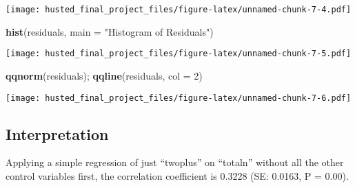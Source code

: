 \documentclass[
]{article}
\newenvironment{Shaded}{\begin{snugshade}}{\end{snugshade}}
\newcommand{\AttributeTok}[1]{\textcolor[rgb]{0.13,0.29,0.53}{#1}}
\newcommand{\CommentTok}[1]{\textcolor[rgb]{0.56,0.35,0.01}{\textit{#1}}}
\newcommand{\DecValTok}[1]{\textcolor[rgb]{0.00,0.00,0.81}{#1}}
\newcommand{\DocumentationTok}[1]{\textcolor[rgb]{0.56,0.35,0.01}{\textbf{\textit{#1}}}}
\newcommand{\FunctionTok}[1]{\textcolor[rgb]{0.13,0.29,0.53}{\textbf{#1}}}
\newcommand{\NormalTok}[1]{#1}
\newcommand{\OtherTok}[1]{\textcolor[rgb]{0.56,0.35,0.01}{#1}}
\newcommand{\SpecialCharTok}[1]{\textcolor[rgb]{0.81,0.36,0.00}{\textbf{#1}}}
\newcommand{\StringTok}[1]{\textcolor[rgb]{0.31,0.60,0.02}{#1}}
\begin{document}
\begin{Shaded}
\end{Shaded}

\texttt{[image: husted\_final\_project\_files/figure-latex/unnamed-chunk-7-4.pdf]}

\begin{Shaded}
\begin{Highlighting}[]
\FunctionTok{hist}\NormalTok{(residuals, }\AttributeTok{main =} \StringTok{"Histogram of Residuals"}\NormalTok{)}
\end{Highlighting}
\end{Shaded}

\texttt{[image: husted\_final\_project\_files/figure-latex/unnamed-chunk-7-5.pdf]}

\begin{Shaded}
\begin{Highlighting}[]
\FunctionTok{qqnorm}\NormalTok{(residuals); }\FunctionTok{qqline}\NormalTok{(residuals, }\AttributeTok{col =} \DecValTok{2}\NormalTok{)}
\end{Highlighting}
\end{Shaded}

\texttt{[image: husted\_final\_project\_files/figure-latex/unnamed-chunk-7-6.pdf]}

\hypertarget{interpretation}{%
\subsection{Interpretation}\label{interpretation}}

Applying a simple regression of just ``twoplus'' on ``totaln'' without
all the other control variables first, the correlation coefficient is
0.3228 (SE: 0.0163, P = 0.00).
\end{document}
